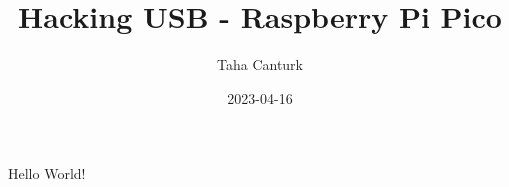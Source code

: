 \documentclass[a4paper,12pt]{article}
\title{Hacking USB - Raspberry Pi Pico}
\author{Taha Canturk}
\date{2023-04-16}
\begin{document}
  \maketitle
  \newpage
  Hello World!
\end{document}
